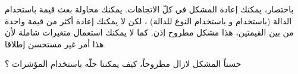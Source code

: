 باختصار، يمكنك إعادة المشكل في كلّ الاتجاهات. يمكنك محاولة بعث قيمة باستخدام الدالة (باستخدام
و باستخدام النوع
للدالة) ، لكن لا يمكنك إعادة أكثر من قيمة واحدة من بين القيمتين، هذا مشكل مطروح إذن. كما لا يمكنك استعمال متغيرات شاملة لأن هذا أمر غير مستحسن إطلاقا.

حسناً المشكل لازال مطروحاً، كيف يمكننا حلّه باستخدام المؤشرات ؟
